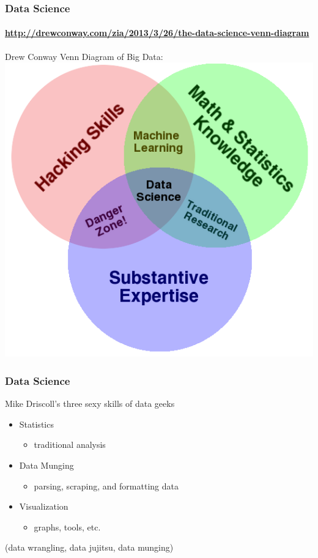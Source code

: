 \documentclass[14pt]{beamer}
\begin{document}
\begin{frame}
  \frametitle{Data Science}
  \framesubtitle{\url{http://drewconway.com/zia/2013/3/26/the-data-science-venn-diagram}}
\begin{center}
Drew Conway Venn Diagram of Big Data:
\includegraphics[width=.5\textwidth]{img/Data_Science_VD}
\end{center}
\end{frame}

\begin{frame}
  \frametitle{Data Science}

  Mike Driscoll’s three sexy skills of data geeks

  \begin{itemize}
  \item Statistics
    \begin{itemize}
    \item traditional analysis
\end{itemize}
\item Data Munging
  \begin{itemize}
  \item parsing, scraping, and formatting data
\end{itemize}
\item Visualization
  \begin{itemize}
  \item graphs, tools, etc.
\end{itemize}
\end{itemize}

\begin{block}{}
  \begin{center}
    (data wrangling, data jujitsu, data munging)
  \end{center}
\end{block}
\end{frame}
\end{document}
